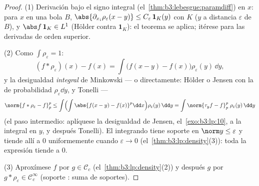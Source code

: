 \begin{proof}
(1) Derivación bajo el signo integral
(el~\cref{thm:b3:lebesgue:paramdiff}) en $x$: para $x$ en una bola $B$,
$\abs{\partial_{x_i}\rho_\varepsilon(x - y)} \leq
C_\varepsilon\,\mathbf 1_{K}(y)$ con $K$
 ($y$ a distancia
$\varepsilon$ de $B$), y $\abs f\,\mathbf 1_K \in L^1$ (Hölder contra
$\mathbf 1_K$): el teorema se aplica; itérese para las derivadas de
orden superior.

(2) Como $\int\rho_\varepsilon = 1$:
\[
(f * \rho_\varepsilon)(x) - f(x)
= \int \bigl(f(x - y) - f(x)\bigr)\rho_\varepsilon(y)\,\dd y ,
\]
y la desigualdad \emph{integral} de Minkowski --- o directamente: Hölder
o Jensen con la  de probabilidad
$\rho_\varepsilon\dd y$, y Tonelli ---
\[
\norm{f*\rho_\varepsilon - f}_p^p
\leq \int\Bigl(\int\abs{f(x-y) -
f(x)}^p\dd x\Bigr)\rho_\varepsilon(y)\,\dd y
= \int \norm{\tau_yf - f}_p^p\;\rho_\varepsilon(y)\,\dd y
\]
(el paso intermedio: aplíquese la desigualdad de Jensen,
el~\cref{exo:b3:lp:10}, a la integral  en $y$, y después
Tonelli). El integrando tiene soporte en $\norm y \leq \varepsilon$ y
tiende allí a $0$ uniformemente cuando $\varepsilon \to 0$
(el~\cref{thm:b3:lp:density}(3)): toda la expresión tiende a
$0$.

(3) Aproxímese $f$ por $g \in \mathcal C_c$
(el~\cref{thm:b3:lp:density}(2)) y después $g$ por $g *
\rho_\varepsilon \in \mathcal C_c^\infty$ (soporte
: suma de soportes).
\end{proof}

